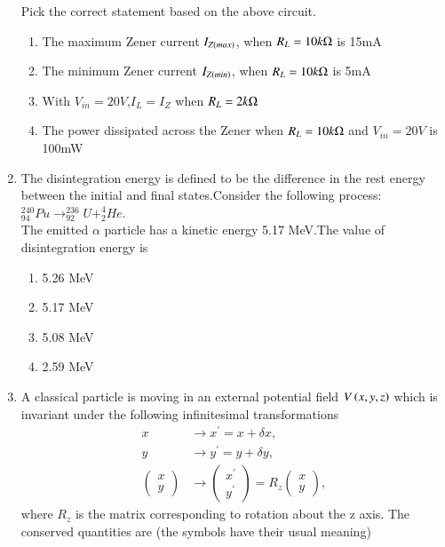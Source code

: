 \documentclass[journal]{IEEEtran}
\begin{document}
\begin{enumerate}[start=37]
Pick the correct statement based on the above circuit.
\begin{enumerate}
    \item The maximum Zener current $I_{Z\left(max\right)}$, when $R_{L}=10k\ohm$ is 15mA
    \item The minimum Zener current $I_{Z\left(min\right)}$, when $R_{L}=10k\ohm$ is 5mA
    \item With $V_{in}=20V$,$I_{L}=I_{Z}$ when $R_{L}=2k\ohm$
    \item The power dissipated across the Zener when $R_{L}=10k\ohm$ and $V_{in}=20V$ is 100mW
\end{enumerate}
\item The disintegration energy is defined to be the difference in the rest energy between the initial and final states.Consider the following process:\\$^{240}_{94}Pu\rightarrow ^{236}_{92}U+^{4}_{2}He$.\\The emitted $\alpha$ particle has a kinetic energy 5.17 MeV.The value of disintegration energy is
\begin{multicols}{4}
\begin{enumerate}
    \item 5.26 MeV
    \item 5.17 MeV
    \item 5.08 MeV
    \item 2.59 MeV
\end{enumerate}
\end{multicols}
\item A classical particle is moving in an external potential field $V\left(x,y,z\right)$ which is invariant under the following infinitesimal transformations
\begin{align*}
x &\rightarrow x^{\prime} = x + \delta x,\\
y &\rightarrow y^{\prime} = y + \delta y,\\
\begin{pmatrix} x \\ y \end{pmatrix} &\rightarrow \begin{pmatrix} x^{\prime} \\ y^{\prime} \end{pmatrix}=R_{z}\begin{pmatrix} x \\ y \end{pmatrix},
\end{align*}
where $R_z$ is the matrix corresponding to rotation about the z axis. The conserved quantities are (the symbols have their usual meaning)

\end{enumerate}
\end{document}
